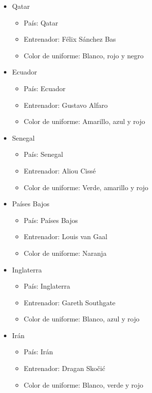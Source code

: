 \begin{itemize}    
    \item Qatar
        \begin{itemize}
            \item País: Qatar
            \item Entrenador: Félix Sánchez Bas
            \item Color de uniforme: Blanco, rojo y negro
        \end{itemize}
    \item Ecuador
        \begin{itemize}
            \item País: Ecuador
            \item Entrenador: Gustavo Alfaro
            \item Color de uniforme: Amarillo, azul y rojo
        \end{itemize}
    \item Senegal
        \begin{itemize}
            \item País: Senegal
            \item Entrenador: Aliou Cissé
            \item Color de uniforme: Verde, amarillo y rojo
        \end{itemize}
    \item Países Bajos
        \begin{itemize}
            \item País: Países Bajos
            \item Entrenador: Louis van Gaal
            \item Color de uniforme: Naranja
        \end{itemize}
    \item Inglaterra
        \begin{itemize}
            \item País: Inglaterra
            \item Entrenador: Gareth Southgate
            \item Color de uniforme: Blanco, azul y rojo
        \end{itemize}
    \item Irán
        \begin{itemize}
            \item País: Irán
            \item Entrenador: Dragan Skočić
            \item Color de uniforme: Blanco, verde y rojo

\end{itemize}
\end{itemize}
